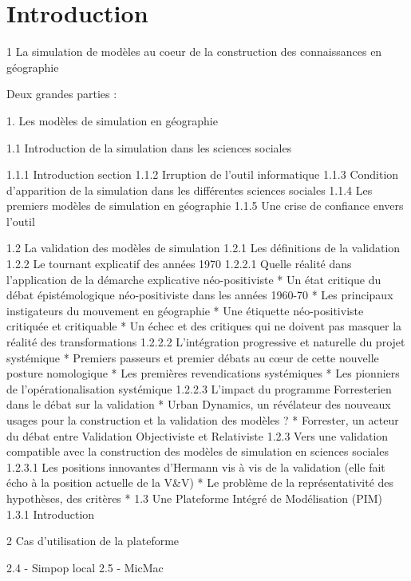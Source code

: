 
\chapter{Introduction}

\startcontents[chapters]
\Mprintcontents


1 La simulation de modèles au coeur de la construction des connaissances en géographie

Deux grandes parties : 

1. Les modèles de simulation en géographie

1.1 Introduction de la simulation dans les sciences sociales 
	
	1.1.1 Introduction section
	1.1.2 Irruption de l'outil informatique
	1.1.3 Condition d'apparition de la simulation dans les différentes sciences sociales
	1.1.4 Les premiers modèles de simulation en géographie
	1.1.5 Une crise de confiance envers l'outil

1.2 La validation des modèles de simulation
	1.2.1 Les définitions de la validation
	1.2.2 Le tournant explicatif des années 1970
		1.2.2.1 Quelle réalité dans l'application de la démarche explicative néo-positiviste
			* Un état critique du débat épistémologique néo-positiviste dans les années 1960-70
			* Les principaux instigateurs du mouvement en géographie
			* Une étiquette néo-positiviste critiquée et critiquable
			* Un échec et des critiques qui ne doivent pas masquer la réalité des transformations
		1.2.2.2 L'intégration progressive et naturelle du projet systémique
			* Premiers passeurs et premier débats au cœur de cette nouvelle posture nomologique
			* Les premières revendications systémiques
			* Les pionniers de l'opérationalisation systémique
		1.2.2.3 L'impact du programme Forresterien dans le débat sur la validation
			* Urban Dynamics, un révélateur des nouveaux usages pour la construction et la validation des modèles ?
			* Forrester, un acteur du débat entre Validation Objectiviste et Relativiste
	1.2.3 Vers une validation compatible avec la construction des modèles de simulation en sciences sociales
			1.2.3.1 Les positions innovantes d'Hermann vis à vis de la validation
				(elle fait écho à la position actuelle de la V\&V)
			* Le problème de la représentativité des hypothèses, des critères
			* 
1.3 Une Plateforme Intégré de Modélisation (PIM)
	1.3.1 Introduction

2 Cas d'utilisation de la plateforme

	2.4 - Simpop local
	2.5 - MicMac 

